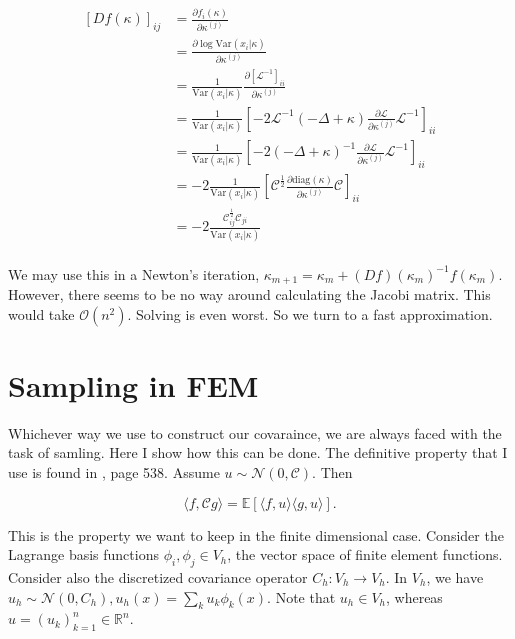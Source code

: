 \documentclass[paper=a4, fontsize=11pt]{scrartcl} %
\numberwithin{equation}{section} %
\numberwithin{figure}{section} %
\numberwithin{table}{section} %
\newcommand{\Op}{\mathcal{L}}
\newcommand{\var}{\text{Var}}
\newcommand{\diag}{\text{diag}}
\begin{document}
\begin{align*}
  [Df(\kappa)]_{ij} &= \frac{ \partial f_{i}(\kappa)}{\partial \kappa^{(j)}} \\
  &= \frac{ \partial \log\var( x_i |\kappa)}{\partial \kappa^{(j)}} \\
  &= \frac{1}{\var(x_i|\kappa)} \frac{ \partial [\Op^{-1}]_{ii}}{\partial \kappa^{(j)}} \\
  &=  \frac{1}{\var(x_i|\kappa)}[-2\Op^{-1} (-\Delta + \kappa)\frac{ \partial \Op }{ \partial \kappa^{(j)} } \Op^{-1}]_{ii} \\ 
  &=  \frac{1}{\var(x_i|\kappa)}[-2 (-\Delta + \kappa)^{-1}\frac{ \partial \Op }{ \partial \kappa^{(j)} } \Op^{-1}]_{ii} \\ 
  &= -2\frac{1}{\var(x_i|\kappa)}[\mathcal{C}^{\frac{1}{2}} \frac{ \partial \diag(\kappa)}{\partial \kappa^{(j)}} \mathcal{C}]_{ii} \\
  &= -2\frac{\mathcal{C}^{\frac{1}{2}}_{ij}\mathcal{C}_{ji}}{\var(x_i|\kappa)} \\
\end{align*}

We may use this in a Newton's iteration, $\kappa_{m+1} = \kappa_{m} + (Df)(\kappa_{m})^{-1}f(\kappa_{m})$.
However, there seems to be no way around calculating the Jacobi matrix. This would take $\mathcal{O}(n^2)$. Solving is even
worst. So we turn to a fast approximation.

\section{Sampling in FEM}

Whichever way we use to construct our covaraince, we are always faced with the task of samling. Here I show how this
can be done. The definitive property that I use is found in 
\cite{stuart2010inverse}, page 538. Assume $u \sim \mathcal{N}(0, \mathcal{C})$. Then

$$
\langle f , \mathcal{C} g \rangle = \mathbb{E}[\langle f,u\rangle \langle g,u \rangle].
$$

This is the property we want to keep in the finite dimensional case. Consider the Lagrange basis
functions $\phi_i, \phi_j \in V_{h}$,
the vector space of finite element functions. Consider also the discretized covariance operator
$C_{h}: V_h \to V_h$.%
In $V_h$, we have $u_{h}\sim \mathcal{N}(0,C_{h}), u_{h}(x) = \sum_{k}u_k\phi_{k}(x)$. Note that $u_{h} \in V_{h}$, whereas
$u = (u_k)_{k=1}^n \in \mathbb{R}^n$.
\end{document}
